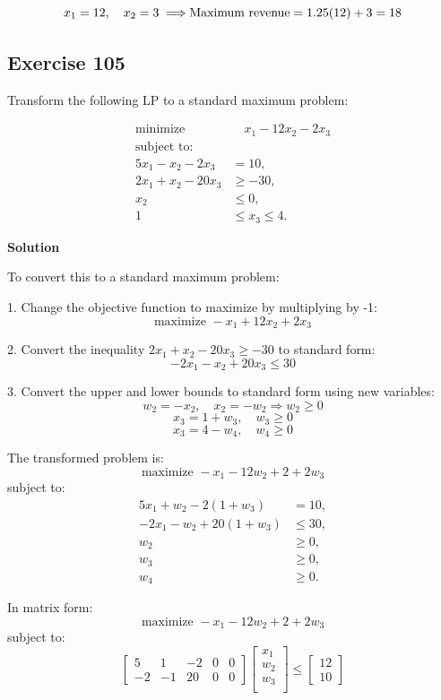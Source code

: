 \documentclass{article}
\begin{document}
\[
x_1 = 12, \quad x_2 = 3 \implies \\
\text{Maximum revenue} = 1.25(12) + 3 = 18
\]

\subsection*{Exercise 105}
Transform the following LP to a standard maximum problem:

\begin{align*}
\text{minimize } & \quad x_1 - 12x_2 - 2x_3 \\
\text{subject to:} & \\
5x_1 - x_2 - 2x_3 &= 10, \\
2x_1 + x_2 - 20x_3 &\geq -30, \\
x_2 &\leq 0, \\
1 &\leq x_3 \leq 4.
\end{align*}

\textbf{Solution}

To convert this to a standard maximum problem:

\vspace{\baselineskip}

1. Change the objective function to maximize by multiplying by -1:
\[
\text{maximize } -x_1 + 12x_2 + 2x_3
\]

2. Convert the inequality \(2x_1 + x_2 - 20x_3 \geq -30\) to standard form:
\[
-2x_1 - x_2 + 20x_3 \leq 30
\]

3. Convert the upper and lower bounds to standard form using new variables:
\[
w_2 = -x_2, \quad x_2 = -w_2 \Rightarrow w_2 \geq 0
\]
\[
x_3 = 1 + w_3, \quad w_3 \geq 0
\]
\[
x_3 = 4 - w_4, \quad w_4 \geq 0
\]

The transformed problem is:
\[
\text{maximize } -x_1 - 12w_2 + 2 + 2w_3
\]
subject to:
\begin{align*}
5x_1 + w_2 - 2(1 + w_3) &= 10, \\
-2x_1 - w_2 + 20(1 + w_3) &\leq 30, \\
w_2 &\geq 0, \\
w_3 &\geq 0, \\
w_4 &\geq 0.
\end{align*}

In matrix form:
\[
\text{maximize } -x_1 - 12w_2 + 2 + 2w_3
\]
subject to:
\[
\begin{bmatrix}
5 & 1 & -2 & 0 & 0 \\
-2 & -1 & 20 & 0 & 0
\end{bmatrix}
\begin{bmatrix}
x_1 \\
w_2 \\
w_3 \\
\end{bmatrix}
\leq
\begin{bmatrix}
12 \\
10
\end{bmatrix}
\]
\end{document}
